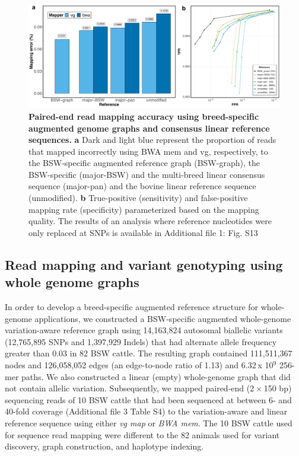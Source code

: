 \documentclass[../main.tex]{subfiles}
\begin{document}
\begin{figure}[!htb]
    \centering
    \includegraphics[width=\textwidth]{paper2/main_figure/Fig5.pdf}
    \caption[Consensus linear mapping]{\textbf{Paired-end read mapping accuracy using breed-specific augmented genome graphs and consensus linear reference sequences.} 
    \small{\textbf{a} Dark and light blue represent the proportion of reads that mapped incorrectly using BWA mem and vg, respectively, to the BSW-specific augmented reference graph (BSW-graph), the BSW-specific (major-BSW) and the multi-breed linear consensus sequence (major-pan) and the bovine linear reference sequence (unmodified). \textbf{b} True-positive (sensitivity) and false-positive mapping rate (specificity) parameterized based on the mapping quality. The results of an analysis where reference nucleotides were only replaced at SNPs is available in Additional file 1: Fig. S13}}
    \label{fig35:consen}
\end{figure}

\subsection*{Read mapping and variant genotyping using whole genome graphs}
In order to develop a breed-specific augmented reference structure for whole-genome applications, we constructed a BSW-specific augmented whole-genome variation-aware reference graph using 14,163,824 autosomal biallelic variants (12,765,895 SNPs and 1,397,929 Indels) that had alternate allele frequency greater than 0.03 in 82 BSW cattle. The resulting graph contained 111,511,367 nodes and 126,058,052 edges (an edge-to-node ratio of 1.13) and 6.32 x 10$^9$ 256-mer paths. We also constructed a linear (empty) whole-genome graph that did not contain allelic variation. Subsequently, we mapped paired-end (2 × 150 bp) sequencing reads of 10 BSW cattle that had been sequenced at between 6- and 40-fold coverage (Additional file 3 Table S4) to the variation-aware and linear reference sequence using either \emph{vg map} or \emph{BWA mem}. The 10 BSW cattle used for sequence read mapping were different to the 82 animals used for variant discovery, graph construction, and haplotype indexing.
\end{document}
